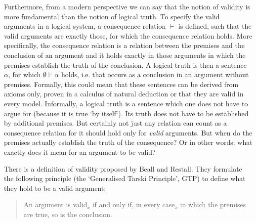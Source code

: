 \documentclass{article}
\begin{document}
Furthermore, from a modern perspective we can say that the notion of validity is more fundamental than the notion of logical truth. To specify the valid arguments in a logical system, a consequence relation $\vdash$ is defined, such that the valid arguments are exactly those, for which the consequence relation holds. More specifically, the consequence relation is a relation between the premises and the conclusion of an argument and it holds exactly in those arguments in which the premises establish the truth of the conclusion. A logical truth is then a sentence $\alpha$, for which $\emptyset\vdash\alpha$ holds, i.e. that occurs as a conclusion in an argument without premises. Formally, this could mean that these sentences can be derived from axioms only, proven in a calculus of natural deduction or that they are valid in every model. Informally, a logical truth is a sentence which one does not have to argue for (because it is true `by itself`). Its truth does not have to be established by additional premises. But certainly not just any relation can count as a consequence relation for it should hold only for \textit{valid} arguments. But when do the premises actually establish the truth of the consequence? Or in other words: what exactly does it mean for an argument to be valid?


There is a definition of validity proposed by Beall and Restall. They formulate the following principle (the `Generalised Tarski Principle', GTP) to define what they hold to be a valid argument:
\begin{quote}
An argument is valid$_x$ if and only if, in every case$_x$ in which the premises are true, so is the conclusion. \cite[p.~29]{beallrestall}
\end{quote}

\end{document}
